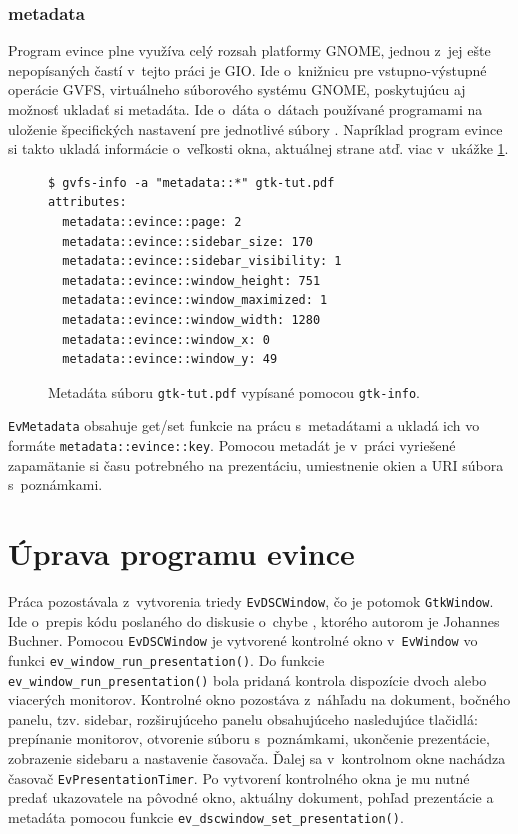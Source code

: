\documentclass[12pt,oneside,final]{fithesis2}
\begin{document}
\subsection{metadata}
Program evince plne využíva celý rozsah platformy GNOME, jednou z~jej ešte nepopísaných častí v~tejto práci je GIO. Ide o~knižnicu pre vstupno-výstupné operácie GVFS, virtuálneho súborového systému GNOME, poskytujúcu aj možnosť ukladať si metadáta. Ide o~dáta o~dátach používané programami na uloženie špecifických nastavení pre jednotlivé súbory \cite{metad}. Napríklad program evince si takto ukladá informácie o~veľkosti okna, aktuálnej strane atď. viac v~ukážke \ref{meta}.
\begin{figure}[hbpt]
\begin{tiny}
\begin{verbatim}
$ gvfs-info -a "metadata::*" gtk-tut.pdf 
attributes:
  metadata::evince::page: 2
  metadata::evince::sidebar_size: 170
  metadata::evince::sidebar_visibility: 1
  metadata::evince::window_height: 751
  metadata::evince::window_maximized: 1
  metadata::evince::window_width: 1280
  metadata::evince::window_x: 0
  metadata::evince::window_y: 49
\end{verbatim}
\end{tiny}
\caption{Metadáta súboru \texttt{gtk-tut.pdf} vypísané pomocou \texttt{gtk-info}.}
\label{meta}
\end{figure}

\texttt{EvMetadata} obsahuje get/set funkcie na prácu s~metadátami a ukladá ich vo formáte \texttt{metadata::evince::key}. Pomocou metadát je v~práci vyriešené zapamätanie si času potrebného na prezentáciu, umiestnenie okien a URI súbora s~poznámkami.

\chapter{Úprava programu evince}
Práca pozostávala z~vytvorenia triedy \texttt{EvDSCWindow}, čo je potomok \texttt{GtkWindow}. Ide o~prepis kódu poslaného do diskusie o~chybe \cite{evbug}, ktorého autorom je Johannes Buchner. Pomocou \texttt{EvDSCWindow} je vytvorené kontrolné okno v~\texttt{EvWindow} vo funkci \texttt{ev\_\-window\_\-run\_\-presentation()}. Do funkcie \texttt{ev\_\-window\_\-run\_\-presentation()} bola pridaná kontrola dispozície dvoch alebo viacerých monitorov. Kontrolné okno pozostáva z~náhľadu na dokument, bočného panelu, tzv. sidebar, rozširujúceho panelu obsahujúceho nasledujúce tlačidlá: prepínanie monitorov, otvorenie súboru s~poznámkami, ukončenie prezentácie, zobrazenie sidebaru a nastavenie časovača. Ďalej sa v~kontrolnom okne nachádza časovač \texttt{EvPresentationTimer}. Po vytvorení kontrolného okna je mu nutné predať ukazovatele na pôvodné okno, aktuálny dokument, pohľad prezentácie a metadáta pomocou funkcie \texttt{ev\_\-dscwindow\_\-set\_\-presentation()}.
\end{document}
